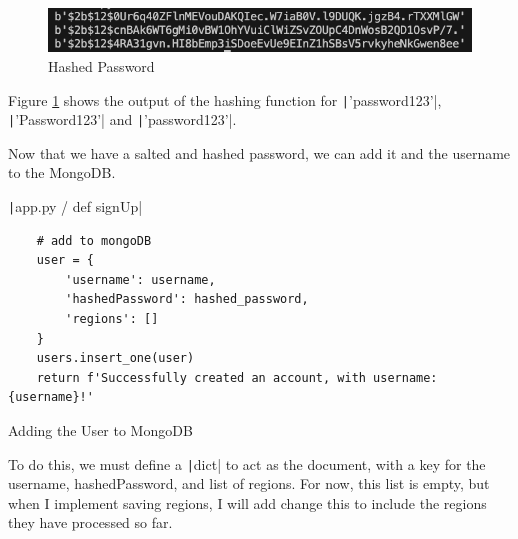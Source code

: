 \documentclass[12pt]{report}
\newcommand{\pil}[1]{\protect\texttt|#1|}
\begin{document}
\begin{figure}[H]
\centering
\includegraphics[width=14cm]{ss15.9.png}
\caption{Hashed Password}\label{fig:ss15.9}
\end{figure}

Figure \ref{fig:ss15.9} shows the output of the hashing function for \pil{'password123'}, \pil{'Password123'} and \pil{'password123'}.

\begin{center}
\end{center}

Now that we have a salted and hashed password, we can add it and the username to the MongoDB.

\begin{listing}[H]
\pil{app.py / def signUp}
\begin{verbatim}
    # add to mongoDB
    user = {
        'username': username,
        'hashedPassword': hashed_password,
        'regions': []
    }
    users.insert_one(user)
    return f'Successfully created an account, with username: {username}!'
\end{verbatim}
\caption{Adding the User to MongoDB}\label{cs:addToMongo}
\end{listing}

To do this, we must define a \pil{dict} to act as the document, with a key for the username, hashedPassword, and list of regions. For now, this list is empty, but when I implement saving regions, I will add change this to include the regions they have processed so far.
\end{document}
